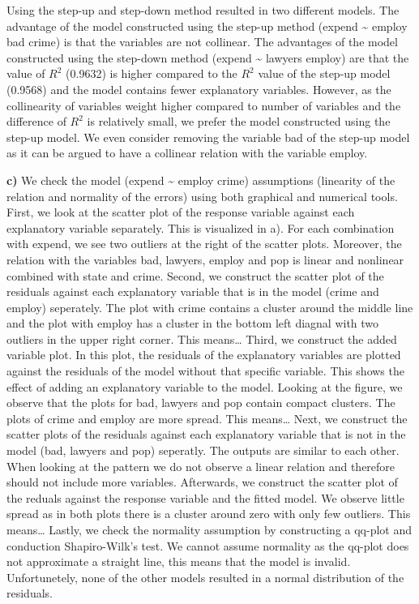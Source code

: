 \documentclass[]{article}
\begin{document}
Using the step-up and step-down method resulted in two different models.
The advantage of the model constructed using the step-up method (expend
\textasciitilde{} employ bad crime) is that the variables are not
collinear. The advantages of the model constructed using the step-down
method (expend \textasciitilde{} lawyers employ) are that the value of
\(R^{2}\) (0.9632) is higher compared to the \(R^{2}\) value of the
step-up model (0.9568) and the model contains fewer explanatory
variables. However, as the collinearity of variables weight higher
compared to number of variables and the difference of \(R^{2}\) is
relatively small, we prefer the model constructed using the step-up
model. We even consider removing the variable bad of the step-up model
as it can be argued to have a collinear relation with the variable
employ.

\textbf{c)} We check the model (expend \textasciitilde{} employ crime)
assumptions (linearity of the relation and normality of the errors)
using both graphical and numerical tools. First, we look at the scatter
plot of the response variable against each explanatory variable
separately. This is visualized in a). For each combination with expend,
we see two outliers at the right of the scatter plots. Moreover, the
relation with the variables bad, lawyers, employ and pop is linear and
nonlinear combined with state and crime. Second, we construct the
scatter plot of the residuals against each explanatory variable that is
in the model (crime and employ) seperately. The plot with crime contains
a cluster around the middle line and the plot with employ has a cluster
in the bottom left diagnal with two outliers in the upper right corner.
This means\ldots{} Third, we construct the added variable plot. In this
plot, the residuals of the explanatory variables are plotted against the
residuals of the model without that specific variable. This shows the
effect of adding an explanatory variable to the model. Looking at the
figure, we observe that the plots for bad, lawyers and pop contain
compact clusters. The plots of crime and employ are more spread. This
means\ldots{} Next, we construct the scatter plots of the residuals
against each explanatory variable that is not in the model (bad, lawyers
and pop) seperatly. The outputs are similar to each other. When looking
at the pattern we do not observe a linear relation and therefore should
not include more variables. Afterwards, we construct the scatter plot of
the reduals against the response variable and the fitted model. We
observe little spread as in both plots there is a cluster around zero
with only few outliers. This means\ldots{} Lastly, we check the
normality assumption by constructing a qq-plot and conduction
Shapiro-Wilk's test. We cannot assume normality as the qq-plot does not
approximate a straight line, this means that the model is invalid.
Unfortunetely, none of the other models resulted in a normal
distribution of the residuals.
\end{document}
